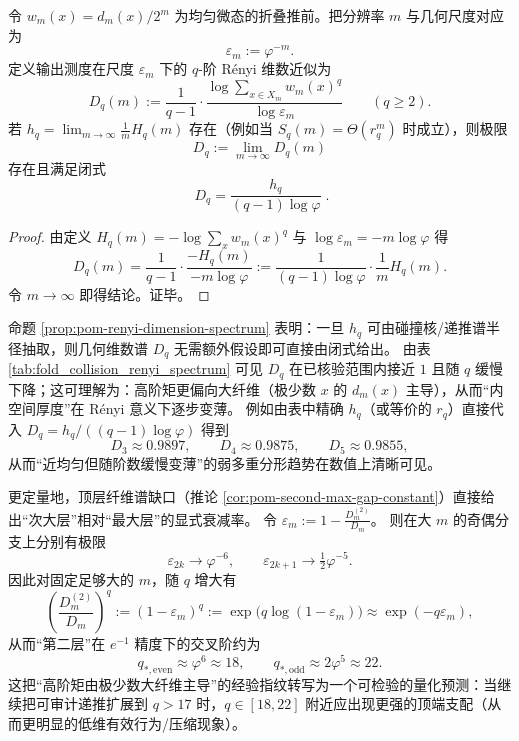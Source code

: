 

\begin{proposition}\label{prop:pom-renyi-dimension-spectrum}
令 \(w_m(x)=d_m(x)/2^m\) 为均匀微态的折叠推前。把分辨率 \(m\) 与几何尺度对应为
\[
\varepsilon_m:=\varphi^{-m}.
\]
定义输出测度在尺度 \(\varepsilon_m\) 下的 \(q\)-阶 Rényi 维数近似为
\[
D_q(m):=\frac{1}{q-1}\cdot \frac{\log\sum_{x\in X_m}w_m(x)^q}{\log \varepsilon_m}
\qquad(q\ge 2).
\]
若 \(h_q=\lim_{m\to\infty}\frac{1}{m}H_q(m)\) 存在（例如当 \(S_q(m)=\Theta(r_q^m)\) 时成立），则极限
\[
D_q:=\lim_{m\to\infty}D_q(m)
\]
存在且满足闭式
\[
\boxed{\;
D_q=\frac{h_q}{(q-1)\log\varphi}\; }.
\]
\end{proposition}
\begin{proof}
由定义 \(H_q(m)=-\log\sum_x w_m(x)^q\) 与 \(\log\varepsilon_m=-m\log\varphi\) 得
\[
D_q(m)=\frac{1}{q-1}\cdot \frac{-H_q(m)}{-m\log\varphi}
:=\frac{1}{(q-1)\log\varphi}\cdot \frac{1}{m}H_q(m).
\]
令 \(m\to\infty\) 即得结论。证毕。
\end{proof}

\begin{remark}\label{rem:pom-renyi-dimension-values}
命题 \ref{prop:pom-renyi-dimension-spectrum} 表明：一旦 \(h_q\) 可由碰撞核/递推谱半径抽取，则几何维数谱 \(D_q\) 无需额外假设即可直接由闭式给出。
由表 \ref{tab:fold_collision_renyi_spectrum} 可见 \(D_q\) 在已核验范围内接近 \(1\) 且随 \(q\) 缓慢下降；这可理解为：高阶矩更偏向大纤维（极少数 \(x\) 的 \(d_m(x)\) 主导），从而“内空间厚度”在 Rényi 意义下逐步变薄。
例如由表中精确 \(h_q\)（或等价的 \(r_q\)）直接代入
\(
D_q=h_q/((q-1)\log\varphi)
\)
得到
\[
D_3\approx 0.9897,\qquad D_4\approx 0.9875,\qquad D_5\approx 0.9855,
\]
从而“近均匀但随阶数缓慢变薄”的弱多重分形趋势在数值上清晰可见。
\par
更定量地，顶层纤维谱缺口（推论 \ref{cor:pom-second-max-gap-constant}）直接给出“次大层”相对“最大层”的显式衰减率。
令
\(
\varepsilon_m:=1-\frac{D_m^{(2)}}{D_m}
\)。
则在大 \(m\) 的奇偶分支上分别有极限
\[
\varepsilon_{2k}\to \varphi^{-6},
\qquad
\varepsilon_{2k+1}\to \tfrac12\varphi^{-5}.
\]
因此对固定足够大的 \(m\)，随 \(q\) 增大有
\[
\left(\frac{D_m^{(2)}}{D_m}\right)^q
:=(1-\varepsilon_m)^q
:=\exp\!\bigl(q\log(1-\varepsilon_m)\bigr)
\approx \exp(-q\varepsilon_m),
\]
从而“第二层”在 \(e^{-1}\) 精度下的交叉阶约为
\[
q_{\ast,\mathrm{even}}\approx \varphi^{6}\approx 18,
\qquad
q_{\ast,\mathrm{odd}}\approx 2\varphi^{5}\approx 22.
\]
这把“高阶矩由极少数大纤维主导”的经验指纹转写为一个可检验的量化预测：当继续把可审计递推扩展到 \(q>17\) 时，\(q\in[18,22]\) 附近应出现更强的顶端支配（从而更明显的低维有效行为/压缩现象）。
\end{remark}

